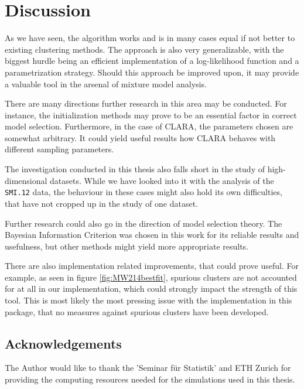 \chapter{Discussion}



As we have seen, the algorithm works and is in many cases equal if not better 
to existing clustering methods. The approach is also very generalizable, with 
the biggest hurdle being an efficient implementation of a log-likelihood 
function and a parametrization strategy.
Should this approach be improved upon, it may provide a valuable tool in the
arsenal of mixture model analysis.

There are many directions further research in this area may be conducted. For 
instance, the initialization methods may prove to be an essential factor in 
correct model selection. Furthermore, in the case of CLARA, the parameters 
chosen are somewhat arbitrary. It could yield useful results how CLARA behaves 
with different sampling parameters.

The investigation conducted in this thesis also falls short in the study of 
high-dimensional datasets. While we have looked into it with the analysis of 
the {\tt SMI.12} data, the behaviour in these cases might also hold its own
difficulties, that have not cropped up in the study of one dataset.

Further research could also go in the direction of model selection theory. The 
Bayesian Information Criterion was chosen in this work for its reliable results
and usefulness, but other methods might yield more appropriate results.

There are also implementation related improvements, that could prove useful.
For example, as seen in figure \ref{fig:MW214bestfit}, spurious clusters are 
not accounted for at all in our implementation, which could strongly impact the
strength of this tool. This is most likely the most pressing issue with the 
implementation in this package, that no measures against spurious clusters
have been developed.


\section{Acknowledgements}

The Author would like to thank the 'Seminar f\"ur Statistik' and ETH Zurich 
for providing the computing resources needed for the simulations used in this
thesis. 
